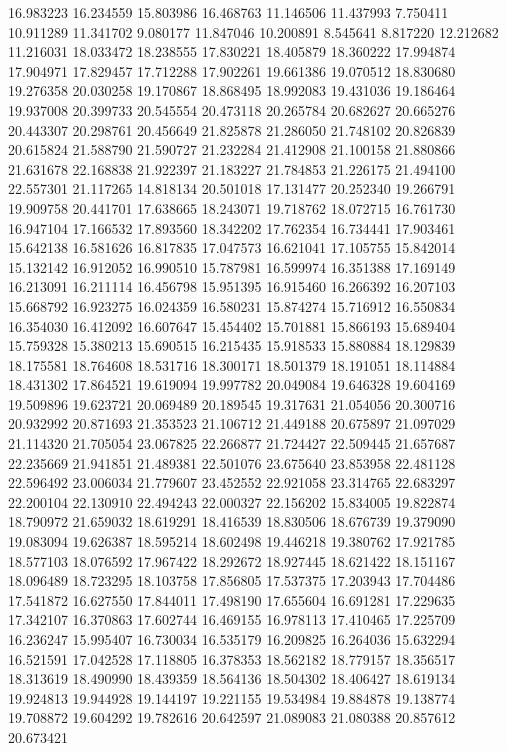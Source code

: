 16.983223
16.234559
15.803986
16.468763
11.146506
11.437993
7.750411
10.911289
11.341702
9.080177
11.847046
10.200891
8.545641
8.817220
12.212682
11.216031
18.033472
18.238555
17.830221
18.405879
18.360222
17.994874
17.904971
17.829457
17.712288
17.902261
19.661386
19.070512
18.830680
19.276358
20.030258
19.170867
18.868495
18.992083
19.431036
19.186464
19.937008
20.399733
20.545554
20.473118
20.265784
20.682627
20.665276
20.443307
20.298761
20.456649
21.825878
21.286050
21.748102
20.826839
20.615824
21.588790
21.590727
21.232284
21.412908
21.100158
21.880866
21.631678
22.168838
21.922397
21.183227
21.784853
21.226175
21.494100
22.557301
21.117265
14.818134
20.501018
17.131477
20.252340
19.266791
19.909758
20.441701
17.638665
18.243071
19.718762
18.072715
16.761730
16.947104
17.166532
17.893560
18.342202
17.762354
16.734441
17.903461
15.642138
16.581626
16.817835
17.047573
16.621041
17.105755
15.842014
15.132142
16.912052
16.990510
15.787981
16.599974
16.351388
17.169149
16.213091
16.211114
16.456798
15.951395
16.915460
16.266392
16.207103
15.668792
16.923275
16.024359
16.580231
15.874274
15.716912
16.550834
16.354030
16.412092
16.607647
15.454402
15.701881
15.866193
15.689404
15.759328
15.380213
15.690515
16.215435
15.918533
15.880884
18.129839
18.175581
18.764608
18.531716
18.300171
18.501379
18.191051
18.114884
18.431302
17.864521
19.619094
19.997782
20.049084
19.646328
19.604169
19.509896
19.623721
20.069489
20.189545
19.317631
21.054056
20.300716
20.932992
20.871693
21.353523
21.106712
21.449188
20.675897
21.097029
21.114320
21.705054
23.067825
22.266877
21.724427
22.509445
21.657687
22.235669
21.941851
21.489381
22.501076
23.675640
23.853958
22.481128
22.596492
23.006034
21.779607
23.452552
22.921058
23.314765
22.683297
22.200104
22.130910
22.494243
22.000327
22.156202
15.834005
19.822874
18.790972
21.659032
18.619291
18.416539
18.830506
18.676739
19.379090
19.083094
19.626387
18.595214
18.602498
19.446218
19.380762
17.921785
18.577103
18.076592
17.967422
18.292672
18.927445
18.621422
18.151167
18.096489
18.723295
18.103758
17.856805
17.537375
17.203943
17.704486
17.541872
16.627550
17.844011
17.498190
17.655604
16.691281
17.229635
17.342107
16.370863
17.602744
16.469155
16.978113
17.410465
17.225709
16.236247
15.995407
16.730034
16.535179
16.209825
16.264036
15.632294
16.521591
17.042528
17.118805
16.378353
18.562182
18.779157
18.356517
18.313619
18.490990
18.439359
18.564136
18.504302
18.406427
18.619134
19.924813
19.944928
19.144197
19.221155
19.534984
19.884878
19.138774
19.708872
19.604292
19.782616
20.642597
21.089083
21.080388
20.857612
20.673421
